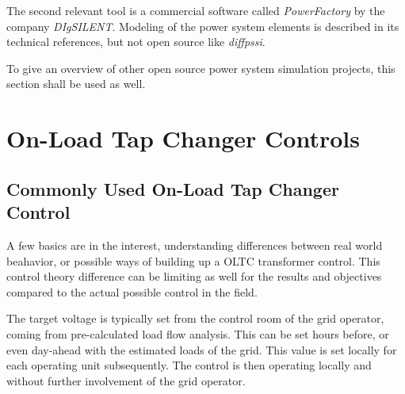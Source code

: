 The second relevant tool is a commercial software called \textit{PowerFactory} by the company \textit{DIgSILENT}.
Modeling of the power system elements is described in its technical references, but not open source like \textit{diffpssi}.

To give an overview of other open source power system simulation projects, this section shall be used as well.

    
        
\section{On-Load Tap Changer Controls}

\subsection{Commonly Used On-Load Tap Changer Control}

A few basics are in the interest, understanding differences between real world beahavior, or possible ways of building up a \acs{OLTC} transformer control. 
This control theory difference can be limiting as well for the results and objectives compared to the actual possible control in the field.

The target voltage is typically set from the control room of the grid operator, coming from pre-calculated load flow analysis. 
This can be set hours before, or even day-ahead with the estimated loads of the grid. 
This value is set locally for each operating unit subsequently. 
The control is then operating locally and without further involvement of the grid operator. \quelle


